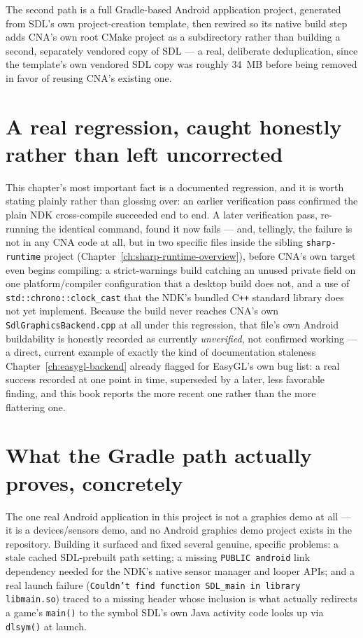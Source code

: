 The second path is a full Gradle-based Android application project, generated from SDL's own
project-creation template, then rewired so its native build step adds CNA's own root CMake
project as a subdirectory rather than building a second, separately vendored copy of SDL ---
a real, deliberate deduplication, since the template's own vendored SDL copy was roughly
34~MB before being removed in favor of reusing CNA's existing one.

\section{A real regression, caught honestly rather than left uncorrected}

This chapter's most important fact is a documented regression, and it is worth stating
plainly rather than glossing over: an earlier verification pass confirmed the plain
NDK cross-compile succeeded end to end. A later verification pass, re-running the identical
command, found it now fails --- and, tellingly, the failure is not in any CNA code at all,
but in two specific files inside the sibling \texttt{sharp-runtime} project
(Chapter~\ref{ch:sharp-runtime-overview}), before CNA's own target even begins compiling: a
strict-warnings build catching an unused private field on one platform/compiler
configuration that a desktop build does not, and a use of
\texttt{std::chrono::clock\_cast} that the NDK's bundled C\texttt{++} standard library does
not yet implement. Because the build never reaches CNA's own \texttt{SdlGraphicsBackend.cpp}
at all under this regression, that file's own Android buildability is honestly recorded as
currently \emph{unverified}, not confirmed working --- a direct, current example of exactly
the kind of documentation staleness Chapter~\ref{ch:easygl-backend} already flagged for
EasyGL's own bug list: a real success recorded at one point in time, superseded by a later,
less favorable finding, and this book reports the more recent one rather than the more
flattering one.

\section{What the Gradle path actually proves, concretely}

The one real Android application in this project is not a graphics demo at all --- it is a
devices/sensors demo, and no Android graphics demo project exists in the repository. Building
it surfaced and fixed several genuine, specific problems: a stale cached SDL-prebuilt path
setting; a missing \texttt{PUBLIC android} link dependency needed for the NDK's native sensor
manager and looper APIs; and a real launch failure (\texttt{Couldn't find function SDL\_main
in library libmain.so}) traced to a missing header whose inclusion is what actually redirects
a game's \texttt{main()} to the symbol SDL's own Java activity code looks up via
\texttt{dlsym()} at launch.

